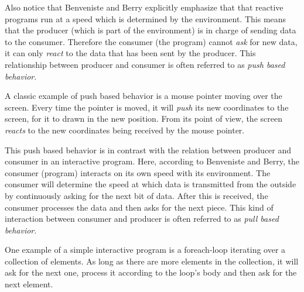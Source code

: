 Also notice that Benveniste and Berry explicitly emphasize that that reactive programs run at a speed which is determined by the environment. This means that the producer (which is part of the environment) is in charge of sending data to the consumer. Therefore the consumer (the program) cannot \emph{ask} for new data, it can only \emph{react} to the data that has been sent by the producer. This relationship between producer and consumer is often referred to as \textit{push based behavior}.

A classic example of push based behavior is a mouse pointer moving over the screen. Every time the pointer is moved, it will \emph{push} its new coordinates to the screen, for it to drawn in the new position. From its point of view, the screen \emph{reacts} to the new coordinates being received by the mouse pointer.

This push based behavior is in contrast with the relation between producer and consumer in an interactive program. Here, according to Benveniste and Berry, the consumer (program) interacts on its own speed with its environment. The consumer will determine the speed at which data is transmitted from the outside by continuously asking for the next bit of data. After this is received, the consumer processes the data and then asks for the next piece. This kind of interaction between consumer and producer is often referred to as \textit{pull based behavior}.

One example of a simple interactive program is a foreach-loop iterating over a collection of elements. As long as there are more elements in the collection, it will ask for the next one, process it according to the loop's body and then ask for the next element.